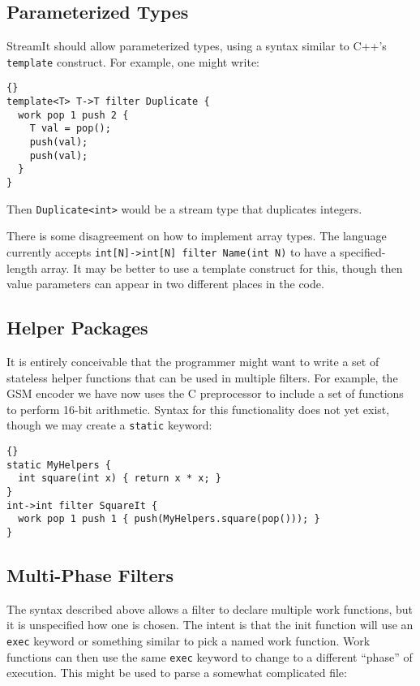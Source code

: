 \documentclass[11pt]{article}
\begin{document}
\subsection{Parameterized Types}

StreamIt should allow parameterized types, using a syntax similar to
C++'s \lstinline|template| construct.  For example, one might write:

\begin{lstlisting}{}
template<T> T->T filter Duplicate {
  work pop 1 push 2 {
    T val = pop();
    push(val);
    push(val);
  }
}
\end{lstlisting}

Then \lstinline|Duplicate<int>| would be a stream type that duplicates
integers.

There is some disagreement on how to implement array types.  The
language currently accepts \lstinline|int[N]->int[N] filter Name(int N)| to
have a specified-length array.  It may be better to use a template
construct for this, though then value parameters can appear in two
different places in the code.

\subsection{Helper Packages}

It is entirely conceivable that the programmer might want to write a
set of stateless helper functions that can be used in multiple
filters.  For example, the GSM encoder we have now uses the C
preprocessor to include a set of functions to perform 16-bit
arithmetic.  Syntax for this functionality does not yet exist, though
we may create a \lstinline|static| keyword:

\begin{lstlisting}{}
static MyHelpers {
  int square(int x) { return x * x; }
}
int->int filter SquareIt {
  work pop 1 push 1 { push(MyHelpers.square(pop())); }
}
\end{lstlisting}

\subsection{Multi-Phase Filters}

The syntax described above allows a filter to declare multiple work
functions, but it is unspecified how one is chosen.  The intent is
that the init function will use an \lstinline|exec| keyword or
something similar to pick a named work function.  Work functions can
then use the same \lstinline|exec| keyword to change to a different
``phase'' of execution.  This might be used to parse a somewhat
complicated file:
\end{document}
